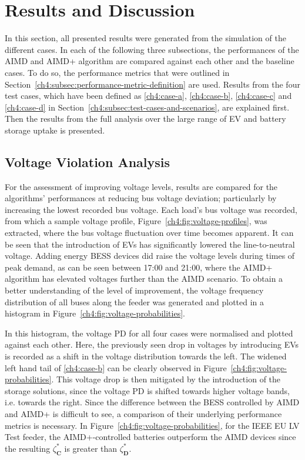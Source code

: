 \section{Results and Discussion}
\label{ch4:sec:results-and-discussion}

In this section, all presented results were generated from the simulation of the different cases.
In each of the following three subsections, the performances of the AIMD and AIMD+ algorithm are compared against each other and the baseline cases.
To do so, the performance metrics that were outlined in Section~\ref{ch4:subsec:performance-metric-definition} are used.
Results from the four test cases, which have been defined as \ref{ch4:case-a}, \ref{ch4:case-b}, \ref{ch4:case-c} and \ref{ch4:case-d} in Section~\ref{ch4:subsec:test-cases-and-scenarios}, are explained first.
Then the results from the full analysis over the large range of EV and battery storage uptake is presented.

\subsection{Voltage Violation Analysis}



For the assessment of improving voltage levels, results are compared for the algorithms' performances at reducing bus voltage deviation; particularly by increasing the lowest recorded bus voltage.
Each load's bus voltage was recorded, from which a sample voltage profile, Figure~\ref{ch4:fig:voltage-profiles}, was extracted, where the bus voltage fluctuation over time becomes apparent. It can be seen that the introduction of EVs has significantly lowered the line-to-neutral voltage. Adding energy BESS devices did raise the voltage levels during times of peak demand, as can be seen between 17:00 and 21:00, where the AIMD+ algorithm has elevated voltages further than the AIMD scenario. To obtain a better understanding of the level of improvement, the voltage frequency distribution of all buses along the feeder was generated and plotted in a histogram in Figure~\ref{ch4:fig:voltage-probabilities}.



In this histogram, the voltage PD for all four cases were normalised and plotted against each other.
Here, the previously seen drop in voltages by introducing EVs is recorded as a shift in the voltage distribution towards the left.
The widened left hand tail of \ref{ch4:case-b} can be clearly observed in Figure~\ref{ch4:fig:voltage-probabilities}.
This voltage drop is then mitigated by the introduction of the storage solutions, since the voltage PD is shifted towards higher voltage bands, i.e. towards the right.
Since the difference between the BESS controlled by AIMD and AIMD+ is difficult to see, a comparison of their underlying performance metrics is necessary.
In Figure~\ref{ch4:fig:voltage-probabilities}, for the IEEE EU LV Test feeder, the AIMD+-controlled batteries outperform the AIMD devices since the resulting $\zeta_\textbf{C}^{*}$ is greater than $\zeta_\textbf{D}^{*}$.

